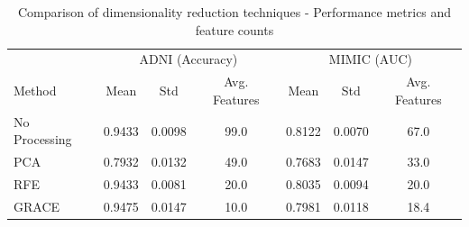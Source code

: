 \begin{table}[h]
\centering
\begin{tabular}{l|cc|c|cc|c}
\hline
& \multicolumn{3}{c|}{ADNI (Accuracy)} & \multicolumn{3}{c}{MIMIC (AUC)} \\
Method & Mean & Std & Avg. Features & Mean & Std & Avg. Features \\
\hline
No Processing & 0.9433 & 0.0098 & 99.0 & 0.8122 & 0.0070 & 67.0 \\
PCA & 0.7932 & 0.0132 & 49.0 & 0.7683 & 0.0147 & 33.0 \\
RFE & 0.9433 & 0.0081 & 20.0 & 0.8035 & 0.0094 & 20.0 \\
GRACE & 0.9475 & 0.0147 & 10.0 & 0.7981 & 0.0118 & 18.4 \\
\hline
\end{tabular}
\caption{Comparison of dimensionality reduction techniques - Performance metrics and feature counts}
\label{tab:performance_comparison}
\end{table}